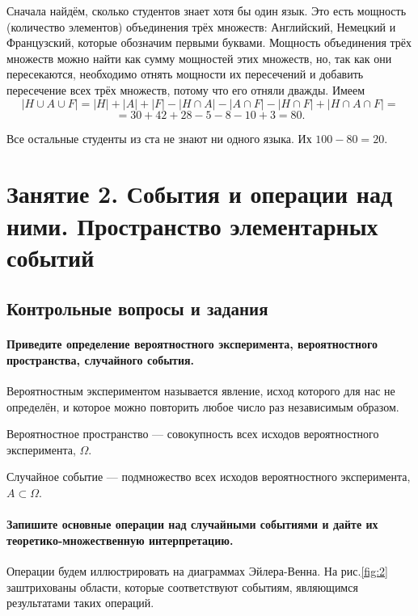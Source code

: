 \documentclass{book}
\begin{document}
Сначала найдём, сколько студентов знает хотя бы один язык. Это есть мощность (количество элементов) объединения трёх множеств: Английский, Немецкий и Французский, которые обозначим первыми буквами. Мощность объединения трёх множеств можно найти как сумму мощностей этих множеств, но, так как они пересекаются, необходимо отнять мощности их пересечений и добавить пересечение всех трёх множеств, потому что его отняли дважды. Имеем $$|H\cup A\cup F|=|H|+|A|+|F|-|H\cap A|-|A\cap F|-|H\cap F|+|H\cap A\cap F|=$$$$=30+42+28-5-8-10+3=80.$$

Все остальные студенты из ста не знают ни одного языка. Их $100-80=20$.

\chapter*{Занятие 2. События и операции над ними. Пространство элементарных событий}

\section*{Контрольные вопросы и задания}

\subsubsection*{Приведите определение вероятностного эксперимента, вероятностного пространства, случайного события.}

Вероятностным экспериментом называется явление, исход которого для нас не определён, и которое можно повторить любое число раз независимым образом.

Вероятностное пространство --- совокупность всех исходов вероятностного эксперимента, $\Omega$.

Случайное событие --- подмножество всех исходов вероятностного эксперимента, $A\subset\Omega$.

\subsubsection*{Запишите основные операции над случайными событиями и дайте их теоретико-множественную интерпретацию.}

Операции будем иллюстрировать на диаграммах Эйлера-Венна. На рис.\ref{fig:2} заштрихованы области, которые соответствуют событиям, являющимся результатами таких операций.
\end{document}
